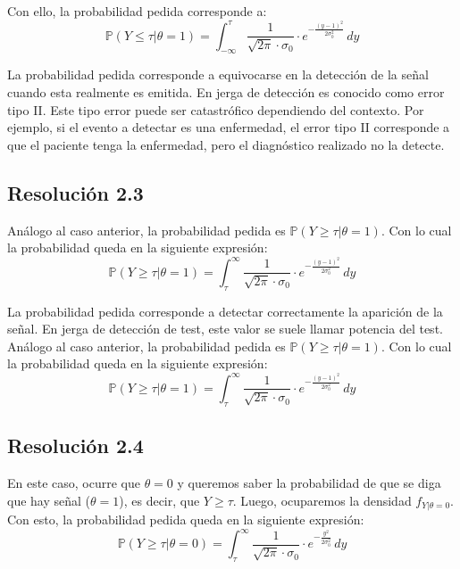 \documentclass[
  11pt,
  letterpaper,
   addpoints,
  answers
  ]{exam}
\begin{document}
\begin{questions}
\begin{solution}
  Con ello, la probabilidad pedida corresponde a:
  \begin{equation}
  \mathbb{P}(Y \leq \tau | \theta = 1) = \int_{-\infty}^{\tau} \frac{1}{\sqrt{2\pi} \cdot \sigma_0} \cdot e^{-\frac{(y-1)^2}{2\sigma_0^2}} \, dy
  \end{equation}
  
  La probabilidad pedida corresponde a equivocarse en la detección de la señal cuando esta realmente es emitida. En jerga de detección es conocido como error tipo II. Este tipo error puede ser catastrófico dependiendo del contexto. Por ejemplo, si el evento a detectar es una enfermedad, el error tipo II corresponde a que el paciente tenga la enfermedad, pero el diagnóstico realizado no la detecte.

  \subsection*{Resolución 2.3}
  
  Análogo al caso anterior, la probabilidad pedida es $\mathbb{P}(Y \geq \tau | \theta = 1)$. Con lo cual la probabilidad queda en la siguiente expresión:
  \begin{equation}
  \mathbb{P}(Y \geq \tau | \theta = 1) = \int_{\tau}^{\infty} \frac{1}{\sqrt{2\pi} \cdot \sigma_0} \cdot e^{-\frac{(y-1)^2}{2\sigma_0^2}} \, dy
  \end{equation}
  
  La probabilidad pedida corresponde a detectar correctamente la aparición de la señal. En jerga de detección de test, este valor se suele llamar potencia del test. Análogo al caso anterior, la probabilidad pedida es $\mathbb{P}(Y \geq \tau | \theta = 1)$. Con lo cual la probabilidad queda en la siguiente expresión:
  \begin{equation}
  \mathbb{P}(Y \geq \tau | \theta = 1) = \int_{\tau}^{\infty} \frac{1}{\sqrt{2\pi} \cdot \sigma_0} \cdot e^{-\frac{(y-1)^2}{2\sigma_0^2}} \, dy
  \end{equation}

  \subsection*{Resolución 2.4}
  
  En este caso, ocurre que $\theta = 0$ y queremos saber la probabilidad de que se diga que hay señal ($\theta = 1$), es decir, que $Y \geq \tau$. Luego, ocuparemos la densidad $f_{Y|\theta=0}$. Con esto, la probabilidad pedida queda en la siguiente expresión:
  \begin{equation}
  \mathbb{P}(Y \geq \tau | \theta = 0) = \int_{\tau}^{\infty} \frac{1}{\sqrt{2\pi} \cdot \sigma_0} \cdot e^{-\frac{y^2}{2\sigma_0^2}} \, dy
  \end{equation}
  

\end{solution}
\end{questions}
\end{document}
